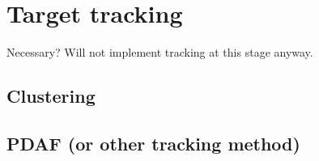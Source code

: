 \section{Target tracking}
Necessary? Will not implement tracking at this stage anyway.
\subsection{Clustering}
\subsection{PDAF (or other tracking method)}

\cleardoublepage